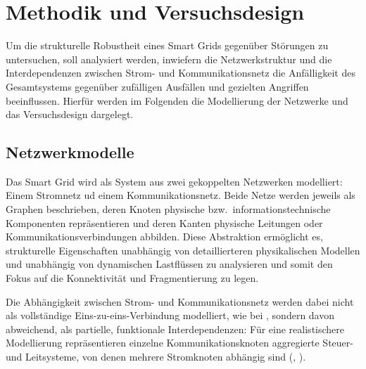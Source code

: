 






% 

\section{Methodik und Versuchsdesign}

Um die strukturelle Robustheit eines Smart Grids gegenüber Störungen zu untersuchen, soll analysiert werden, inwiefern die Netzwerkstruktur und die Interdependenzen zwischen Strom- und Kommunikationsnetz die Anfälligkeit des Gesamtsystems gegenüber zufälligen Ausfällen und gezielten Angriffen beeinflussen. Hierfür werden im Folgenden die Modellierung der Netzwerke und das Versuchsdesign dargelegt. 

\subsection{Netzwerkmodelle}
Das Smart Grid wird als System aus zwei gekoppelten Netzwerken modelliert: Einem Stromnetz ud einem Kommunikationsnetz. Beide Netze werden jeweils als Graphen beschrieben, deren Knoten physische bzw.\ informationstechnische Komponenten repräsentieren und deren Kanten physische Leitungen oder Kommunikationsverbindungen abbilden. Diese Abstraktion ermöglicht es, strukturelle Eigenschaften unabhängig von detaillierteren physikalischen Modellen und unabhängig von dynamischen Lastflüssen zu analysieren und somit den Fokus auf die Konnektivität und Fragmentierung zu legen. 

Die Abhängigkeit zwischen Strom- und Kommunikationsnetz werden dabei nicht als vollständige Eins-zu-eins-Verbindung modelliert, wie bei \cite{Buldyrev2010Interdependent}, sondern davon abweichend, als partielle, funktionale Interdependenzen: Für eine realistischere Modellierung repräsentieren einzelne Kommunikationsknoten aggregierte Steuer- und Leitsysteme, von denen mehrere Stromknoten abhängig sind (\cite[vgl.][2]{Parshani2010}, \cite[vgl.][1709]{Yagan2012}). 

